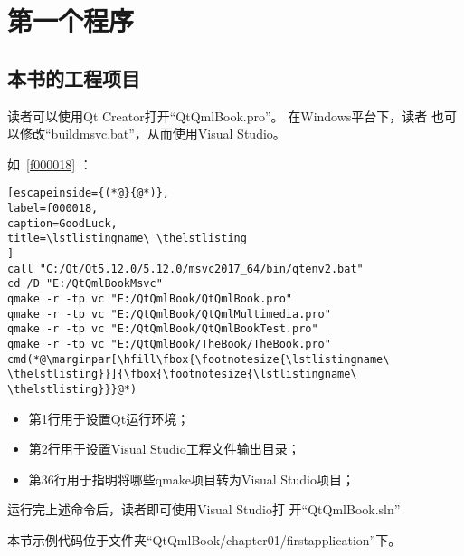 ﻿




%

\FloatBarrier
\section{
第一个程序
}\label{s100210}


\FloatBarrier
\subsection{
本书的工程项目
}\label{ss001u10}


读者可以使用Qt Creator打开“QtQmlBook.pro”。
在Windows平台下，读者
也可以修改“build\underline{\hspace{0.5em}}msvc.bat”，从而使用Visual Studio。

如\lstlistingname\ \ref{f000018} ：


\FloatBarrier
\begin{lstlisting}[escapeinside={(*@}{@*)},
label=f000018,
caption=GoodLuck,
title=\lstlistingname\ \thelstlisting
]
call "C:/Qt/Qt5.12.0/5.12.0/msvc2017_64/bin/qtenv2.bat"
cd /D "E:/QtQmlBookMsvc"
qmake -r -tp vc "E:/QtQmlBook/QtQmlBook.pro"
qmake -r -tp vc "E:/QtQmlBook/QtQmlMultimedia.pro"
qmake -r -tp vc "E:/QtQmlBook/QtQmlBookTest.pro"
qmake -r -tp vc "E:/QtQmlBook/TheBook/TheBook.pro"
cmd(*@\marginpar[\hfill\fbox{\footnotesize{\lstlistingname\ \thelstlisting}}]{\fbox{\footnotesize{\lstlistingname\ \thelstlisting}}}@*)\end{lstlisting}          %



\begin{itemize}

\item 第1行用于设置Qt运行环境；
\item 第2行用于设置Visual Studio工程文件输出目录；
\item 第3\raisebox{0.16ex}{\sourcefonttwo\~{}}6行用于指明将哪些qmake项目转为Visual Studio项目；

\end{itemize}

运行完上述命令后，读者即可使用Visual Studio打
开“QtQmlBook.sln”

本节示例代码位于文件夹“QtQmlBook/chapter01/firstapplication”下。

